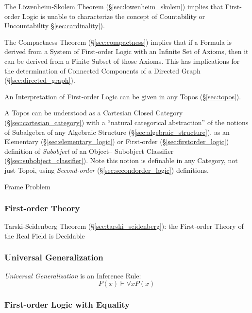 The L\"owenheim-Skolem Theorem (\S\ref{sec:lowenheim_skolem}) implies
that First-order Logic is unable to characterize the concept of
Countability or Uncountability \S\ref{sec:cardinality}).

The Compactness Theorem (\S\ref{sec:compactness}) implies that
if a Formula is derived from a System of First-order Logic with an
Infinite Set of Axioms, then it can be derived from a Finite Subset of
those Axioms. This has implications for the determination of Connected
Components of a Directed Graph (\S\ref{sec:directed_graph}).

An Interpretation of First-order Logic can be given in any Topos
(\S\ref{sec:topos}).

\fist A Topos can be understood as a Cartesian Closed Category
(\S\ref{sec:cartesian_category}) with a ``natural categorical abstraction'' of
the notions of Subalgebra of any Algebraic Structure
(\S\ref{sec:algebraic_structure}), as an Elementary
(\S\ref{sec:elementary_logic}) or First-order (\S\ref{sec:firstorder_logic})
definition of \emph{Subobject} of an Object-- Subobject Classifier
(\S\ref{sec:subobject_classifier}).
Note this notion is definable in any Category, not just Topoi, using
\emph{Second-order} (\S\ref{sec:secondorder_logic}) definitions.

Frame Problem %



\subsubsection{First-order Theory}\label{sec:firstorder_theory}

Tarski-Seidenberg Theorem (\S\ref{sec:tarski_seidenberg}): the First-order
Theory of the Real Field is Decidable



\subsubsection{Universal Generalization}\label{sec:universal_generalization}

\emph{Universal Generalization} is an Inference Rule:
\[
  P(x) \vdash \forall x P(x)
\]



\subsubsection{First-order Logic with Equality}
\label{sec:firstorder_equality}

